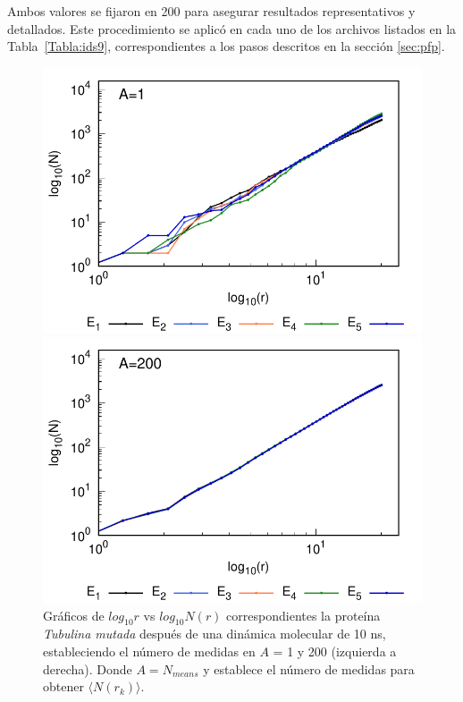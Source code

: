 	Ambos valores se fijaron en 200 para asegurar resultados representativos y detallados. Este procedimiento se aplic\'{o} en cada uno de los archivos listados en la Tabla~\ref{Tabla:ids9}, correspondientes a los pasos descritos en la secci\'{o}n \ref{sec:pfp}.
	
	
	\begin{figure}[H]
		\hspace{-0.3cm} 
		\begin{minipage}{0.49\textwidth}
			\centering
			\includegraphics[width=\linewidth,page=1]{graphs/PDBs/Tubb4/TubMutA=1.pdf}
		\end{minipage}
		\hspace{0.2cm}
		\begin{minipage}{0.49\textwidth}
			\centering
			\includegraphics[width=\linewidth,page=1]{graphs/PDBs/Tubb4/TubMutA=200.pdf}
		\end{minipage}
		
		\caption{
			Gr\'{a}ficos de $log_{10}r$ vs $log_{10}N(r)$ correspondientes la proteína \textit{Tubulina mutada} despu\'{e}s de una din\'{a}mica molecular de 10 ns, estableciendo el número de medidas en  $A$ = 1 y 200 (izquierda a derecha). Donde $A = N_{means}$ y establece el número de medidas para obtener $\langle N(r_k) \rangle$.}
		\label{fig:Nmeasp}
	\end{figure}
	
